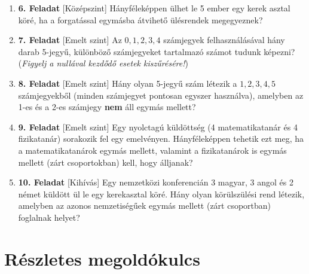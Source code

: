 \documentclass[12pt,a4paper]{article}
\begin{document}
\begin{enumerate}
    \vspace{0.3cm}

    \item \textbf{6. Feladat} \textsf{\small [Középszint]}
    Hányféleképpen ülhet le 5 ember egy kerek asztal köré, ha a forgatással egymásba átvihető ülésrendek megegyeznek?

    \vspace{0.3cm}

    \item \textbf{7. Feladat} \textsf{\small [Emelt szint]}
    Az $0, 1, 2, 3, 4$ számjegyek felhasználásával hány darab 5-jegyű, különböző számjegyeket tartalmazó számot tudunk képezni? (\emph{Figyelj a nullával kezdődő esetek kiszűrésére!})

    \vspace{0.3cm}

    \item \textbf{8. Feladat} \textsf{\small [Emelt szint]}
    Hány olyan 5-jegyű szám létezik a $1, 2, 3, 4, 5$ számjegyekből (minden számjegyet pontosan egyszer használva), amelyben az 1-es és a 2-es számjegy \textbf{nem} áll egymás mellett?

    \vspace{0.3cm}

    \item \textbf{9. Feladat} \textsf{\small [Emelt szint]}
    Egy nyolctagú küldöttség (4 matematikatanár és 4 fizikatanár) sorakozik fel egy emelvényen. Hányféleképpen tehetik ezt meg, ha a matematikatanárok egymás mellett, valamint a fizikatanárok is egymás mellett (zárt csoportokban) kell, hogy álljanak?

    \vspace{0.3cm}

    \item \textbf{10. Feladat} \textsf{\small [Kihívás]}
    Egy nemzetközi konferencián 3 magyar, 3 angol és 2 német küldött ül le egy kerekasztal köré. Hány olyan körülszülési rend létezik, amelyben az azonos nemzetiségűek egymás mellett (zárt csoportban) foglalnak helyet?

\end{enumerate}

\newpage
\section*{Részletes megoldókulcs}
\end{document}
